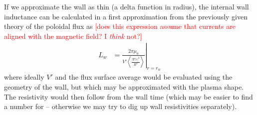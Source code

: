 \documentclass[11pt,a4paper]{article}
\newcommand{\rd}{\ensuremath{\mathrm{d}}}
\newcommand{\sub}[1]{\ensuremath{_{\text{#1}}}}
\begin{document}
If we approximate the wall as thin (a delta function in radius), the internal wall inductance can be calculated in a first approximation from the previously given theory of the poloidal flux as \textcolor{red}{[does this expression assume that currents are aligned with the magnetic field? I \emph{think} not?]}
\begin{align}
L_w &= \left.\frac{2\pi\mu_0}{V'\left\langle \frac{|\nabla r|^2}{R^2}\right\rangle }\right|_{r=r_w}
\end{align}
where ideally $V'$ and the flux surface average would be evaluated using the geometry of the wall, but which may be approximated with the plasma shape. The resistivity would then follow from the wall time (which may be easier to find a number for -- otherwise we may try to dig up wall resistivities separately). 

\end{document}
